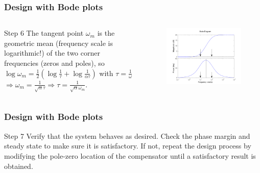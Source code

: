 \begin{frame}\frametitle{Design with Bode plots}

\begin{columns}
	\begin{column}{.49\textwidth}
		\begin{block}{Step 6}
		The tangent point $\omega_m$ is the geometric mean (frequency scale is logarithmic!) of the two corner frequencies (zeros and poles), so
		$ \log \omega_m = \frac{1}{2}(\log \frac{1}{\tau} + \log \frac{1}{\alpha\tau})$ with $\tau = \frac{1}{\omega}$
		\\ $\Rightarrow \omega_m = \frac{1}{\sqrt{\alpha}\tau} \Rightarrow \tau = \frac{1}{\sqrt{\alpha}\omega_m}$.
		\end{block} 
	\end{column}
	
	\begin{column}{.49\textwidth}
		\begin{figure}
			\centering
			\includegraphics[width=1
			\linewidth]{tangentpointpijlen}
		\end{figure}
	\end{column}
\end{columns}

\end{frame}

\begin{frame}
	\frametitle{Design with Bode plots}
	\begin{block}{Step 7}
		Verify that the system behaves as desired.
		Check the phase margin and steady state to make sure it is satisfactory. If not, repeat the design process
		by modifying the pole-zero location of the compensator until a satisfactory result
		is obtained.
	\end{block}
\end{frame}

